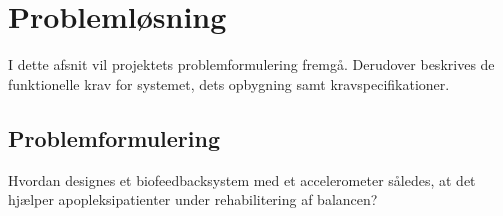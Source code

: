 \chapter{Problemløsning}
I dette afsnit vil projektets problemformulering fremgå. Derudover beskrives de funktionelle krav for systemet, dets opbygning samt kravspecifikationer.

\section{Problemformulering}
Hvordan designes et biofeedbacksystem med et accelerometer således, at det hjælper apopleksipatienter under rehabilitering af balancen?
%
%

